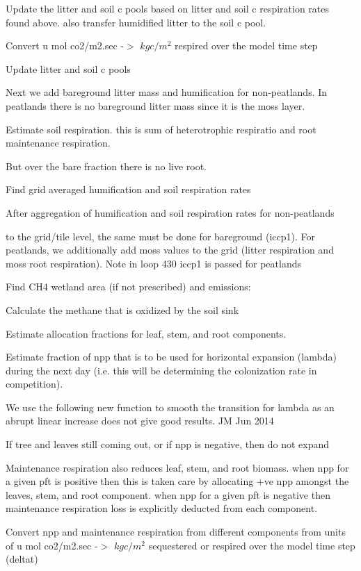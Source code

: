 Update the litter and soil c pools based on litter and soil c respiration rates found above. also transfer humidified litter to the soil c pool.

Convert u mol co2/m2.\+sec -\/$>$ $kg c/m^2$ respired over the model time step

Update litter and soil c pools \begin{DoxyVerb}     Next we add bareground litter mass and humification for non-peatlands. In
     peatlands there is no bareground litter mass since it is the moss layer. \end{DoxyVerb}


Estimate soil respiration. this is sum of heterotrophic respiratio and root maintenance respiration.

But over the bare fraction there is no live root.

Find grid averaged humification and soil respiration rates \begin{DoxyVerb}After aggregation of humification and soil respiration rates for non-peatlands
\end{DoxyVerb}
 to the grid/tile level, the same must be done for bareground (iccp1). For peatlands, we additionally add moss values to the grid (litter respiration and moss root respiration). Note in loop 430 iccp1 is passed for peatlands

Find C\+H4 wetland area (if not prescribed) and emissions\+:

Calculate the methane that is oxidized by the soil sink

Estimate allocation fractions for leaf, stem, and root components.

Estimate fraction of npp that is to be used for horizontal expansion (lambda) during the next day (i.\+e. this will be determining the colonization rate in competition).

We use the following new function to smooth the transition for lambda as an abrupt linear increase does not give good results. J\+M Jun 2014

If tree and leaves still coming out, or if npp is negative, then do not expand

Maintenance respiration also reduces leaf, stem, and root biomass. when npp for a given pft is positive then this is taken care by allocating +ve npp amongst the leaves, stem, and root component. when npp for a given pft is negative then maintenance respiration loss is explicitly deducted from each component.

Convert npp and maintenance respiration from different components from units of u mol co2/m2.\+sec -\/$>$ $kg c/m^2$ sequestered or respired over the model time step (deltat)

